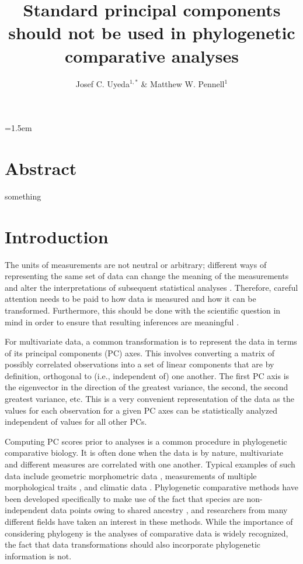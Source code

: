 \documentclass[a4paper,12pt]{article}
\title{Standard principal components should not be used in phylogenetic comparative analyses}
\author{
Josef C. Uyeda$^{1,*}$ \& Matthew W. Pennell$^1$
}
\date{}
\affiliation{
 $^{1}$ Department of Biological Sciences \& Institute for Bioinformatics and Evolutionary Studies, University of Idaho, Moscow, ID 83844, U.S.A.\\ 
 $^{*}$ Email for correspondence: \texttt{pseudacris@gmail.com}\\
}
\begin{document}
\mstitlepage
\parindent=1.5em
\addtolength{\parskip}{.3em}
\vfill

\section{Abstract}
something
\vfill

\newpage

\section{Introduction}
The units of measurements are not neutral or arbitrary; different ways of representing the same set of data can change the meaning of the measurements and alter the interpretations of subsequent statistical analyses \citep{Hand2004, HansenHoule2008, Houle2011}. Therefore, careful attention needs to be paid to how data is measured and how it can be transformed. Furthermore, this should be done with the scientific question in mind in order to ensure that resulting inferences are meaningful \citep{Houle2011}. 

For multivariate data, a common transformation is to represent the data in terms of its principal components (PC) axes. This involves converting a matrix of possibly correlated observations into a set of linear components that are by definition, orthogonal to (i.e., independent of) one another. The first PC axis is the eigenvector in the direction of the greatest variance, the second, the second greatest variance, etc. This is a very convenient representation of the data as the values for each observation for a given PC axes can be statistically analyzed independent of values for all other PCs. 

Computing PC scores prior to analyses is a common procedure in phylogenetic comparative biology. It is often done when the data is by nature, multivariate and different measures are correlated with one another. Typical examples of such data include geometric morphometric data \citep[e.g.,][]{Dornburg2011, Hunt2013}, measurements of multiple morphological traits \citep[e.g.,][]{Harmon2010, BergmannIrshick2012, Weir2012, Pienaar2013}, and climatic data \citep[e.g.,][]{KozakWiens2010, Schnitzler2012}. Phylogenetic comparative methods \citep[PCMs; recently reviewed by][]{PennellHarmon} have been developed specifically to make use of the fact that species are non-independent data points owing to shared ancestry \citep{Felsenstein1985}, and researchers from many different fields have taken an interest in these methods. While the importance of considering phylogeny is the analyses of comparative data is widely recognized, the fact that data transformations should also incorporate phylogenetic information is not.
\end{document}

